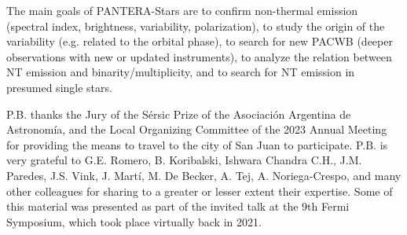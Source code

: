 \documentclass[baaa]{baaa}
\begin{document}
The main goals of PANTERA-Stars are to confirm non-thermal emission (spectral index, brightness, variability, polarization), to study the origin of the variability (e.g. related to the orbital phase), to search for new PACWB (deeper observations with new or updated instruments), to analyze the relation between NT emission and binarity/multiplicity, and to search for NT emission in presumed single stars.

\begin{acknowledgement}
P.B. thanks the Jury of the Sérsic Prize of the Asociación Argentina de Astronomía, and the Local Organizing Committee of the 2023 Annual Meeting 
for providing the means to travel to the city of San Juan to participate. P.B. is very grateful to G.E. Romero, B. Koribalski, Ishwara Chandra C.H., J.M. Paredes, J.S. Vink, J. Martí, M. De Becker, A. Tej, A. Noriega-Crespo, and many other colleagues for sharing to a greater or lesser extent their expertise. Some of this material was presented as part of the invited talk at the 9th Fermi Symposium, which took place virtually back in 2021.
\end{acknowledgement}



\small

 
\end{document}
